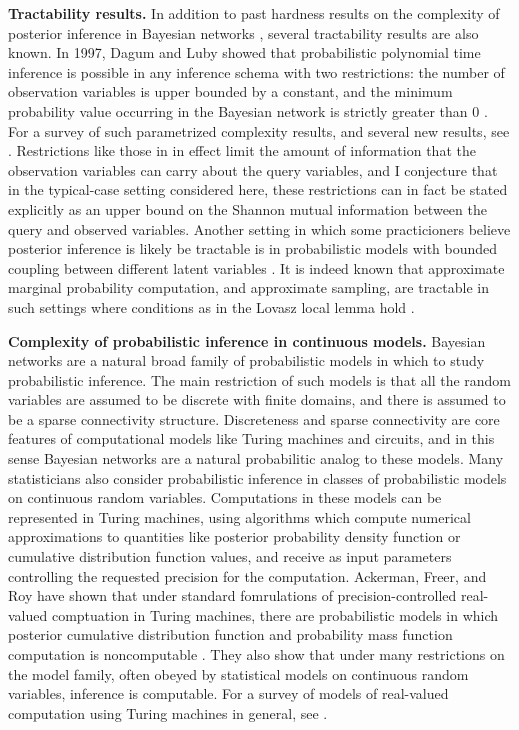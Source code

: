\documentclass{article}
\theoremstyle{definition}
\theoremstyle{remark}
\begin{document}
\textbf{Tractability results.}
In addition to past hardness results on the complexity of posterior inference in Bayesian networks \cite{cooper1990,dagum1993}, several tractability results are also known.
In 1997, Dagum and Luby showed that probabilistic polynomial time inference is possible in any inference schema with two restrictions: the number of observation variables is upper bounded by a constant, and the minimum probability value occurring in the Bayesian network is strictly greater than $0$ \cite{dagum1997optimal}.
For a survey of such parametrized complexity results, and several new results, see \cite{kwisthout2018approximate}.
Restrictions like those in \cite{dagum1997optimal} in effect limit the amount of information that the observation variables can carry about the query variables,
and I conjecture that in the typical-case setting considered here, these restrictions can in fact be stated explicitly as an upper bound on the Shannon mutual information between the query and observed variables.
Another setting in which some practicioners believe posterior inference is likely be tractable is in probabilistic models with bounded coupling between different latent variables \cite{freer2010probabilistic}.
It is indeed known that approximate marginal probability computation, and approximate sampling, are tractable in such settings where conditions as in the Lovasz local lemma hold \cite{moitra2019approximate}.

\textbf{Complexity of probabilistic inference in continuous models.}
Bayesian networks are a natural broad family of probabilistic models in which to study probabilistic inference.
The main restriction of such models is that all the random variables are assumed to be discrete with finite domains, and there is assumed to be a sparse connectivity structure.
Discreteness and sparse connectivity are core features of computational models like Turing machines and circuits, and in this sense Bayesian networks are a natural probabilitic analog to these models.
Many statisticians also consider probabilistic inference in classes of probabilistic models on continuous random variables.
Computations in these models can be represented in Turing machines, using algorithms which compute numerical approximations to quantities like posterior probability density function or cumulative distribution function values, and receive as input parameters controlling the requested precision for the computation.
Ackerman, Freer, and Roy have shown that under standard fomrulations of precision-controlled real-valued comptuation in Turing machines,
there are probabilistic models in which posterior cumulative distribution function and probability mass function computation is noncomputable \cite{ackerman2019computability}.
They also show that under many restrictions on the model family, often obeyed by statistical models on continuous random variables, inference is computable.
For a survey of models of real-valued computation using Turing machines in general, see \cite{weihrauch2012computable}.
\end{document}
